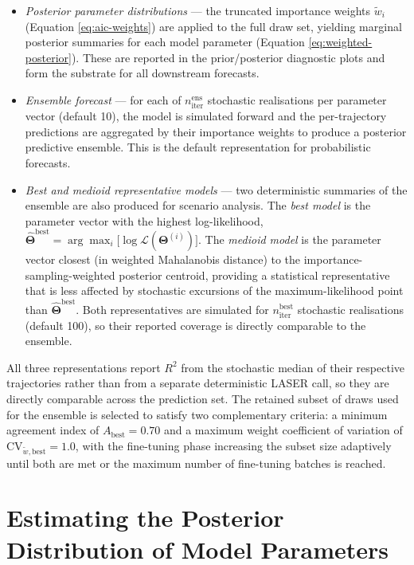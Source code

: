 \documentclass[
]{book}
\begin{document}
\begin{itemize}
\item
  \emph{Posterior parameter distributions} --- the truncated importance weights \(\tilde w_i\) (Equation \eqref{eq:aic-weights}) are applied to the full draw set, yielding marginal posterior summaries for each model parameter (Equation \eqref{eq:weighted-posterior}). These are reported in the prior/posterior diagnostic plots and form the substrate for all downstream forecasts.
\item
  \emph{Ensemble forecast} --- for each of \(n_{\text{iter}}^{\text{ens}}\) stochastic realisations per parameter vector (default 10), the model is simulated forward and the per-trajectory predictions are aggregated by their importance weights to produce a posterior predictive ensemble. This is the default representation for probabilistic forecasts.
\item
  \emph{Best and medioid representative models} --- two deterministic summaries of the ensemble are also produced for scenario analysis. The \emph{best model} is the parameter vector with the highest log-likelihood, \(\hat{\boldsymbol{\Theta}}^{\text{best}} = \arg\max_i\bigl[\log\mathcal{L}(\boldsymbol{\Theta}^{(i)})\bigr]\). The \emph{medioid model} is the parameter vector closest (in weighted Mahalanobis distance) to the importance-sampling-weighted posterior centroid, providing a statistical representative that is less affected by stochastic excursions of the maximum-likelihood point than \(\hat{\boldsymbol{\Theta}}^{\text{best}}\). Both representatives are simulated for \(n_{\text{iter}}^{\text{best}}\) stochastic realisations (default 100), so their reported coverage is directly comparable to the ensemble.
\end{itemize}

All three representations report \(R^2\) from the stochastic median of their respective trajectories rather than from a separate deterministic LASER call, so they are directly comparable across the prediction set. The retained subset of draws used for the ensemble is selected to satisfy two complementary criteria: a minimum agreement index of \(A_{\text{best}} = 0.70\) and a maximum weight coefficient of variation of \(\mathrm{CV}_{\tilde w,\text{best}} = 1.0\), with the fine-tuning phase increasing the subset size adaptively until both are met or the maximum number of fine-tuning batches is reached.

\section{Estimating the Posterior Distribution of Model Parameters}\label{estimating-the-posterior-distribution-of-model-parameters}
\end{document}
